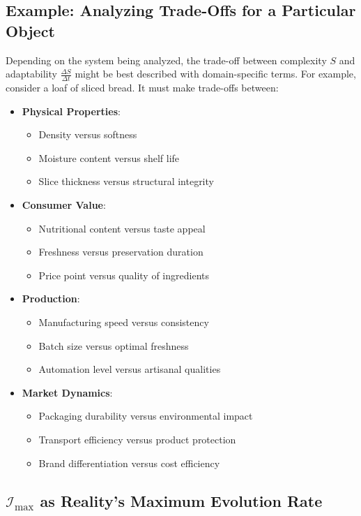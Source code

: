 \documentclass[12pt]{article}
\begin{document}
\subsection{Example: Analyzing Trade-Offs for a Particular Object}
Depending on the system being analyzed, the trade-off between complexity \( S \) and adaptability \( \frac{\Delta S}{\Delta t} \) might be best described with domain-specific terms. For example, consider a loaf of sliced bread. It must make trade-offs between:
\begin{itemize}
    \item \textbf{Physical Properties}:
    \begin{itemize}
        \item Density versus softness
        \item Moisture content versus shelf life
        \item Slice thickness versus structural integrity
    \end{itemize}
    \item \textbf{Consumer Value}:
    \begin{itemize}
        \item Nutritional content versus taste appeal
        \item Freshness versus preservation duration
        \item Price point versus quality of ingredients
    \end{itemize}
    \item \textbf{Production}:
    \begin{itemize}
        \item Manufacturing speed versus consistency
        \item Batch size versus optimal freshness
        \item Automation level versus artisanal qualities
    \end{itemize}
    \item \textbf{Market Dynamics}:
    \begin{itemize}
        \item Packaging durability versus environmental impact
        \item Transport efficiency versus product protection
        \item Brand differentiation versus cost efficiency
    \end{itemize}
\end{itemize}


\subsection{\(\mathcal{I}_{\text{max}}\) as Reality's Maximum Evolution Rate}
\end{document}

